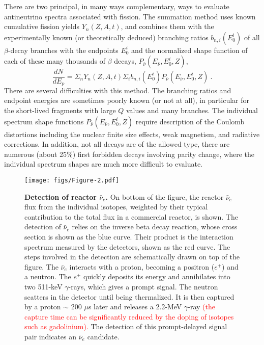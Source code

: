 \documentclass[aps,twocolumn,preprintnumbers,amsmath,superscriptaddress,amssymb,floats,nofootinbib]{revtex4-1}
\begin{document}
There are two principal, in many ways complementary, ways to evaluate antineutrino spectra associated with fission. 
 The summation method uses known cumulative fission yields $Y_n (Z,A,t)$, and combines them
 with the experimentally known (or theoretically deduced) branching ratios $b_{n,i}(E^i_0)$ of all $\beta$-decay branches with the endpoints $E^i_0$ and the
 normalized shape function of each of these many thousands of $\beta$ decays, $P_{\bar{\nu}} (E_{\bar{\nu}},E^i_0,Z)$,
 \begin{equation}
 \frac{dN}{dE_{\bar{\nu}}} = \Sigma_n Y_n (Z,A,t) \Sigma_i b_{n,i}(E^i_0) P_{\bar{\nu}} (E_{\bar{\nu}},E^i_0,Z) ~.
 \end{equation}
 There are several difficulties with this method. The branching ratios and endpoint energies are sometimes poorly known (or not at all), in particular for
 the short-lived fragments with large $Q$ values and many branches. The individual spectrum shape functions $P_{\bar{\nu}} (E_{\bar{\nu}},E^i_0,Z)$
 require description of the Coulomb distortions including the nuclear finite size effects, weak magnetism, and radiative corrections. In addition, not all
 decays are of the allowed type, there are numerous (about 25\%) first forbidden decays involving parity change, where the individual spectrum 
 shapes are much more difficult to evaluate. 
 
 \begin{figure}[tb]
 \begin{centering}
 \texttt{[image: figs/Figure-2.pdf]}
 \par\end{centering}
 \caption{\label{fig:spectra} {\bf Detection of reactor $\bar{\nu}_e$.} On bottom of the figure, the reactor $\bar{\nu}_e$ flux from the individual isotopes, weighted by their typical contribution to the total flux in a commercial reactor, is shown. The detection of $\bar{\nu}_e$ relies on the inverse beta decay reaction, whose cross section is shown as the blue curve. Their product is the interaction spectrum measured by the detectors, shown as the red curve. 
 The steps involved in the detection are schematically drawn on top of the figure. The $\bar{\nu}_e$ interacts with a proton, becoming a positron ($e^+$) and a neutron. The $e^+$ quickly deposits its energy and annihilates into two 511-keV $\gamma$-rays, which gives a prompt signal. The neutron scatters in the detector until being thermalized. It is then captured by a proton $\sim$ 200 $\mu$s later and releases a 2.2-MeV $\gamma$-ray \textcolor{red}{(the capture time can be significantly reduced by the doping of isotopes such as gadolinium).} The detection of this prompt-delayed signal pair indicates an $\bar{\nu}_e$ candidate.}
 \end{figure}
 
\end{document}
